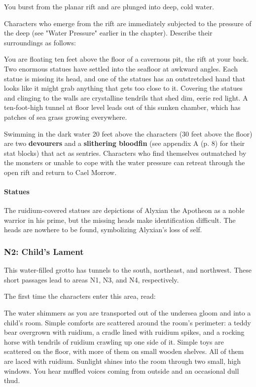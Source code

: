 \documentclass[letterpaper, 11pt, bg=full, twocolumn]{dndbook}
\begin{document}
\begin{DndReadAloud}
You burst from the planar rift and are plunged into deep, cold water.
\end{DndReadAloud}

Characters who emerge from the rift are immediately subjected to the pressure of the deep (see "Water Pressure" earlier in the chapter). Describe their surroundings as follows:

\begin{DndReadAloud}
You are floating ten feet above the floor of a cavernous pit, the rift at your back. Two enormous statues have settled into the seafloor at awkward angles. Each statue is missing its head, and one of the statues has an outstretched hand that looks like it might grab anything that gets too close to it. Covering the statues and clinging to the walls are crystalline tendrils that shed dim, eerie red light. A ten-foot-high tunnel at floor level leads out of this sunken chamber, which has patches of sea grass growing everywhere.
\end{DndReadAloud}

Swimming in the dark water 20 feet above the characters (30 feet above the floor) are two \textbf{devourers} and a \textbf{slithering bloodfin} (see appendix A (p. 8) for their stat blocks) that act as sentries. Characters who find themselves outmatched by the monsters or unable to cope with the water pressure can retreat through the open rift and return to Cael Morrow.

\paragraph{Statues}

The ruidium-covered statues are depictions of Alyxian the Apotheon as a noble warrior in his prime, but the missing heads make identification difficult. The heads are nowhere to be found, symbolizing Alyxian's loss of self.

\subsubsection{N2: Child's Lament}

This water-filled grotto has tunnels to the south, northeast, and northwest. These short passages lead to areas N1, N3, and N4, respectively.

The first time the characters enter this area, read:

\begin{DndReadAloud}
The water shimmers as you are transported out of the undersea gloom and into a child's room. Simple comforts are scattered around the room's perimeter: a teddy bear overgrown with ruidium, a cradle lined with ruidium spikes, and a rocking horse with tendrils of ruidium crawling up one side of it. Simple toys are scattered on the floor, with more of them on small wooden shelves. All of them are laced with ruidium.
Sunlight shines into the room through two small, high windows. You hear muffled voices coming from outside and an occasional dull thud.
\end{DndReadAloud}
\end{document}
